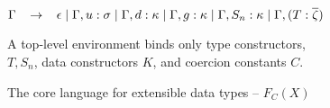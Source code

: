 {\begin{figure}[H]
\vspace{5mm}
\vspace{2mm}

$
\Gamma \;\;\; \to \;\;\; \epsilon \;|\; \Gamma,u:\sigma \;|\; \Gamma,d:\kappa
\;|\; \Gamma,g:\kappa \;|\; \Gamma,S_n:\kappa
\;|\; \Gamma, (T:\overline{\zeta})
$

A top-level environment binds only type constructors, \\
$T,S_n$, data constructors $K$, and coercion constants $C$.
\caption{The core language for extensible data types -- $F_C(X)$}
\label{fig:langdef}
\end{figure}}

